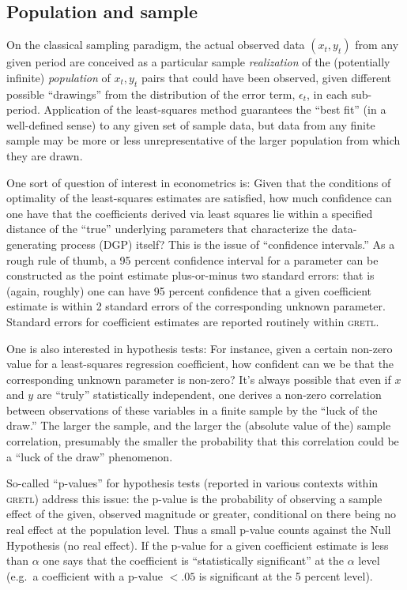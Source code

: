 \documentclass{article}
\begin{document}
\subsection{Population and sample}

On the classical sampling paradigm, the actual observed data $(x_t,
y_t)$ from any given period are conceived as a particular sample
\textit{realization} of the (potentially infinite) \textit{population}
of $x_t, y_t$ pairs that could have been observed, given different
possible ``drawings'' from the distribution of the error term,
$\epsilon_t$, in each sub-period.  Application of the least-squares
method guarantees the ``best fit'' (in a well-defined sense) to any
given set of sample data, but data from any finite sample may be more
or less unrepresentative of the larger population from which they are
drawn.

One sort of question of interest in econometrics is: Given that the
conditions of optimality of the least-squares estimates are satisfied,
how much confidence can one have that the coefficients derived via
least squares lie within a specified distance of the ``true''
underlying parameters that characterize the data-generating process
(DGP) itself?  This is the issue of ``confidence intervals.''  As a
rough rule of thumb, a 95 percent confidence interval for a parameter
can be constructed as the point estimate plus-or-minus two standard
errors: that is (again, roughly) one can have 95 percent confidence
that a given coefficient estimate is within 2 standard errors of the
corresponding unknown parameter.  Standard errors for coefficient
estimates are reported routinely within \textsc{gretl}. 

One is also interested in hypothesis tests: For instance, given a
certain non-zero value for a least-squares regression coefficient, how
confident can we be that the corresponding unknown parameter is
non-zero?  It's always possible that even if $x$ and $y$ are ``truly''
statistically independent, one derives a non-zero correlation between
observations of these variables in a finite sample by the ``luck of
the draw.''  The larger the sample, and the larger the (absolute value
of the) sample correlation, presumably the smaller the probability
that this correlation could be a ``luck of the draw'' phenomenon.

So-called ``p-values'' for hypothesis tests (reported in various
contexts within \textsc{gretl}) address this issue: the p-value is the
probability of observing a sample effect of the given, observed
magnitude or greater, conditional on there being no real effect at the
population level.  Thus a small p-value counts against the Null
Hypothesis (no real effect).  If the p-value for a given coefficient
estimate is less than $\alpha$ one says that the coefficient is
``statistically significant'' at the $\alpha$ level (e.g.\ a
coefficient with a p-value $< .05$ is significant at the 5 percent
level).  
\end{document}
